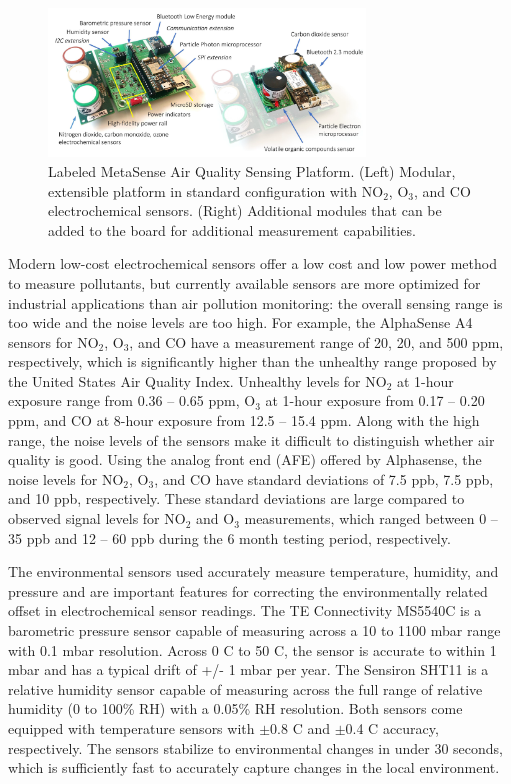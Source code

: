 \documentclass[journal abbreviation, manuscript]{copernicus}
\newcommand{\textus}[1]{$_{\text{#1}}$}
\begin{document}
\begin{figure}
\centering
\includegraphics[width=0.75\textwidth]{writeup/img/metasense-platform}
\caption{Labeled MetaSense Air Quality Sensing Platform. (Left) Modular, extensible platform in standard configuration with NO\textus{2}, O\textus{3}, and CO electrochemical sensors. (Right) Additional modules that can be added to the board for additional measurement capabilities.}
\label{fig:img-label}
\end{figure}

Modern low-cost electrochemical sensors offer a low cost and low power method to measure pollutants, but currently available sensors are more optimized for industrial applications than air pollution monitoring: the overall sensing range is too wide and the noise levels are too high. For example, the AlphaSense A4 sensors for NO\textus{2}, O\textus{3}, and CO have a measurement range of 20, 20, and 500 ppm, respectively, which is significantly higher than the unhealthy range proposed by the United States Air Quality Index. Unhealthy levels for NO\textus{2} at 1-hour exposure range from 0.36 – 0.65 ppm, O\textus{3} at 1-hour exposure from 0.17 – 0.20 ppm, and CO at 8-hour exposure from 12.5 – 15.4 ppm. Along with the high range, the noise levels of the sensors make it difficult to distinguish whether air quality is good. Using the analog front end (AFE) offered by Alphasense, the noise levels for NO\textus{2}, O\textus{3}, and CO have standard deviations of 7.5 ppb, 7.5 ppb, and 10 ppb, respectively. These standard deviations are large compared to observed signal levels for NO\textus{2} and O\textus{3} measurements, which ranged between 0 – 35 ppb and 12 – 60 ppb during the 6 month testing period, respectively.

The environmental sensors used accurately measure temperature, humidity, and pressure and are important features for correcting the environmentally related offset in electrochemical sensor readings. The TE Connectivity MS5540C is a barometric pressure sensor capable of measuring across a 10 to 1100 mbar range with 0.1 mbar resolution. Across 0 C to 50 C, the sensor is accurate to within 1 mbar and has a typical drift of +/- 1 mbar per year. The Sensiron SHT11 is a relative humidity sensor capable of measuring across the full range of relative humidity (0 to 100\% RH) with a 0.05\% RH resolution. Both sensors come equipped with temperature sensors with $\pm$0.8 C and $\pm$0.4 C accuracy, respectively. The sensors stabilize to environmental changes in under 30 seconds, which is sufficiently fast to accurately capture changes in the local environment.
\end{document}
